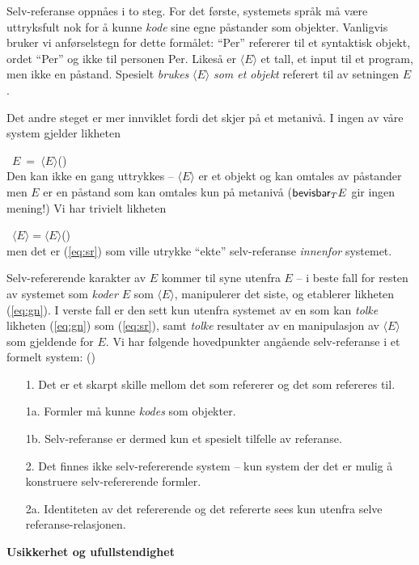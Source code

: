\documentclass[10pt,twocolumn,leqno]{article}
\newcounter{EQ}
\newcommand{\equ}[1]{\refstepcounter{EQ}\vspace{.5ex}\par\noindent\ 
    \hfill #1\hfill{(\theEQ)}\\[.5ex]}
\newcommand{\refp}[1]{(\ref{#1})}
\newcommand{\<}{\langle}
\renewcommand{\>}{\rangle}
\newcommand{\MyLPar}{\parsep -.2ex plus.2ex minus.2ex\itemsep\parsep
   \vspace{-\topsep}\vspace{.5ex}}
\begin{document}
Selv-referanse oppn{\aa}es i to steg. For det 
f{\o}rste, systemets spr{\aa}k m{\aa} v{\ae}re uttryksfult nok for 
{\aa} kunne {\em kode} sine egne p{\aa}stander som objekter. 
Vanligvis bruker vi anf{\o}rselstegn for dette form{\aa}let:
``Per'' refererer til et syntaktisk objekt, ordet ``Per''
og ikke til personen Per. Likes{\aa} er $\<E\>$ et tall, et input 
til et program, men ikke en p{\aa}stand. Spesielt {\em brukes} 
$\<E\>$ {\em som et objekt} referert til av setningen $E$.

Det andre steget er mer innviklet fordi det skjer p{\aa} et 
metaniv{\aa}. I ingen av v{\aa}re system gjelder 
likheten
\equ{$E\ =\ \<E\>$}\label{eq:sr}
Den kan ikke en gang uttrykkes -- $\<E\>$ er et objekt og
kan omtales av  p{\aa}stander men  $E$ er en p{\aa}stand 
som kan omtales kun p{\aa} metaniv{\aa} (${\sf bevisbar}_{T}E$ 
gir ingen mening!) Vi har trivielt likheten 
\equ{$\<E\>=\<E\>$}\label{eq:gn}
men det er 
\refp{eq:sr} som ville utrykke ``ekte'' selv-referanse {\em innenfor} systemet.

Selv-refererende karakter av $E$ kommer 
til syne utenfra $E$ -- i beste fall for resten av
systemet som {\em koder} $E$ som $\<E\>$, manipulerer det siste,
og etablerer likheten \refp{eq:gn}. I verste fall er den
sett kun  utenfra systemet av en som kan {\em 
tolke} likheten \refp{eq:gn} som \refp{eq:sr}, samt 
{\em tolke} resultater av en manipulasjon av $\<E\>$ som gjeldende for $E$.
Vi har f{\o}lgende hovedpunkter ang{\aa}ende 
selv-referanse i et formelt system: 
\hfill{(\theEQ)\label{no:sr}}
\begin{itemize}\MyLPar
\item[1.] Det er et skarpt skille mellom det som refererer 
og det som refereres til. 
\item[1a.] Formler m{\aa} kunne {\em kodes} som objekter.
\item[1b.] Selv-referanse er dermed kun et spesielt tilfelle av 
referanse. 
\item[2.] Det finnes ikke selv-refererende system -- kun system der 
 det er mulig {\aa} konstruere selv-refererende formler. 
\item[2a.] Identiteten av det refererende og det refererte sees kun 
utenfra selve referanse-relasjonen.
\end{itemize}  
%
{\bf Usikkerhet og ufullstendighet}
\end{document}
